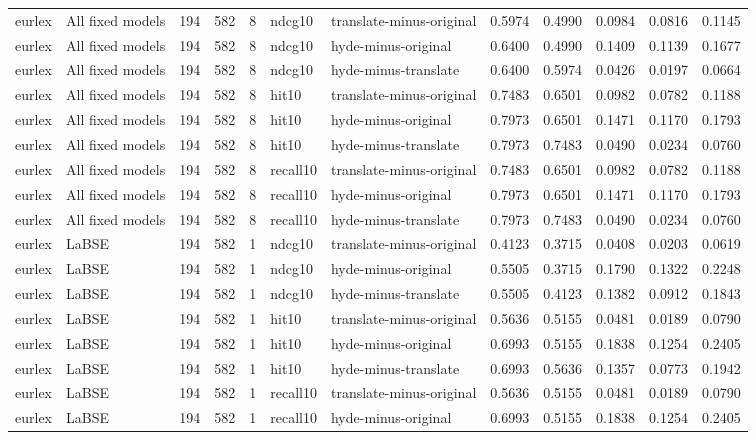 \begin{tabular}{llrrrllrrrrr}
eurlex & All fixed models & 194 & 582 & 8 & ndcg10 & translate-minus-original & 0.5974 & 0.4990 & 0.0984 & 0.0816 & 0.1145 \\
eurlex & All fixed models & 194 & 582 & 8 & ndcg10 & hyde-minus-original & 0.6400 & 0.4990 & 0.1409 & 0.1139 & 0.1677 \\
eurlex & All fixed models & 194 & 582 & 8 & ndcg10 & hyde-minus-translate & 0.6400 & 0.5974 & 0.0426 & 0.0197 & 0.0664 \\
eurlex & All fixed models & 194 & 582 & 8 & hit10 & translate-minus-original & 0.7483 & 0.6501 & 0.0982 & 0.0782 & 0.1188 \\
eurlex & All fixed models & 194 & 582 & 8 & hit10 & hyde-minus-original & 0.7973 & 0.6501 & 0.1471 & 0.1170 & 0.1793 \\
eurlex & All fixed models & 194 & 582 & 8 & hit10 & hyde-minus-translate & 0.7973 & 0.7483 & 0.0490 & 0.0234 & 0.0760 \\
eurlex & All fixed models & 194 & 582 & 8 & recall10 & translate-minus-original & 0.7483 & 0.6501 & 0.0982 & 0.0782 & 0.1188 \\
eurlex & All fixed models & 194 & 582 & 8 & recall10 & hyde-minus-original & 0.7973 & 0.6501 & 0.1471 & 0.1170 & 0.1793 \\
eurlex & All fixed models & 194 & 582 & 8 & recall10 & hyde-minus-translate & 0.7973 & 0.7483 & 0.0490 & 0.0234 & 0.0760 \\
eurlex & LaBSE & 194 & 582 & 1 & ndcg10 & translate-minus-original & 0.4123 & 0.3715 & 0.0408 & 0.0203 & 0.0619 \\
eurlex & LaBSE & 194 & 582 & 1 & ndcg10 & hyde-minus-original & 0.5505 & 0.3715 & 0.1790 & 0.1322 & 0.2248 \\
eurlex & LaBSE & 194 & 582 & 1 & ndcg10 & hyde-minus-translate & 0.5505 & 0.4123 & 0.1382 & 0.0912 & 0.1843 \\
eurlex & LaBSE & 194 & 582 & 1 & hit10 & translate-minus-original & 0.5636 & 0.5155 & 0.0481 & 0.0189 & 0.0790 \\
eurlex & LaBSE & 194 & 582 & 1 & hit10 & hyde-minus-original & 0.6993 & 0.5155 & 0.1838 & 0.1254 & 0.2405 \\
eurlex & LaBSE & 194 & 582 & 1 & hit10 & hyde-minus-translate & 0.6993 & 0.5636 & 0.1357 & 0.0773 & 0.1942 \\
eurlex & LaBSE & 194 & 582 & 1 & recall10 & translate-minus-original & 0.5636 & 0.5155 & 0.0481 & 0.0189 & 0.0790 \\
eurlex & LaBSE & 194 & 582 & 1 & recall10 & hyde-minus-original & 0.6993 & 0.5155 & 0.1838 & 0.1254 & 0.2405 \\

\end{tabular}
